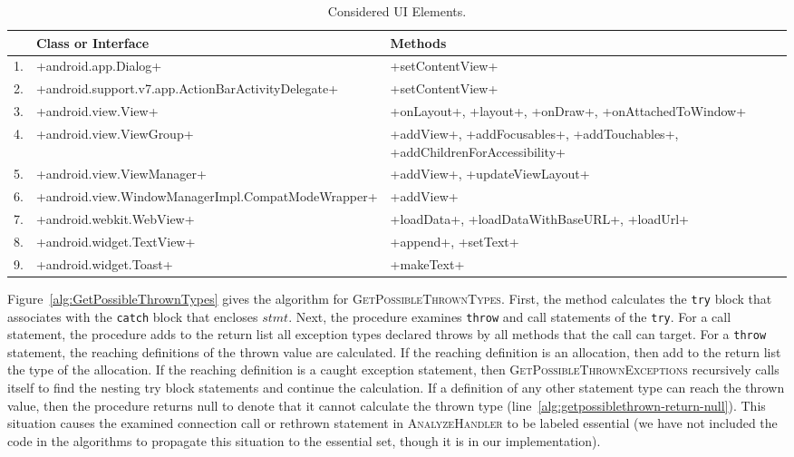 \begin{table}[t]
\small
\renewcommand*{\arraystretch}{1.3}
\caption{Considered UI Elements.}
\label{tbl:ui}
\centering
\tabcolsep=1.5pt
\begin{tabular}{|l|P{3.7cm}|P{4cm}|}
\hline
& \textbf{Class or Interface} & \textbf{Methods} \\
. & +android.app.Dialog+                                 & +setContentView+ \\
2. & +android.support.v7.app.ActionBarActivityDelegate+  & +setContentView+ \\
3. & +android.view.View+                                  & +onLayout+, +layout+, +onDraw+, +onAttachedToWindow+ \\
4. & +android.view.ViewGroup+                             & +addView+, +addFocusables+, +addTouchables+, +addChildrenForAccessibility+ \\
5. & +android.view.ViewManager+                           & +addView+, +updateViewLayout+ \\
6. & +android.view.WindowManagerImpl.CompatModeWrapper+  & +addView+ \\
7. & +android.webkit.WebView+                             & +loadData+, +loadDataWithBaseURL+, +loadUrl+ \\
8. & +android.widget.TextView+       & +append+, +setText+ \\
9. & +android.widget.Toast+        & +makeText+ \\
\hline
\end{tabular}
\end{table}

Figure~\ref{alg:GetPossibleThrownTypes} gives the algorithm for
\textsc{GetPossibleThrownTypes}.  First, the method calculates the
\lstinline!try! block that associates with the \lstinline!catch! block
that encloses $stmt$. Next, the procedure examines \lstinline!throw!
and call statements of the \lstinline!try!.  For a call statement, the
procedure adds to the return list all exception types declared throws
by all methods that the call can target.  For a \lstinline!throw!
statement, the reaching definitions of the thrown value are
calculated.  If the reaching definition is an allocation, then add to
the return list the type of the allocation.  If the reaching
definition is a caught exception statement, then
\textsc{GetPossibleThrownExceptions} recursively calls itself to find
the nesting try block statements and continue the calculation.  If a
definition of any other statement type can reach the thrown value,
then the procedure returns null to denote that it cannot calculate the
thrown type (line~\ref{alg:getpossiblethrown-return-null}).  This
situation causes the examined connection call or rethrown statement in
\textsc{AnalyzeHandler} to be labeled essential (we have not included
the code in the algorithms to propagate this situation to the
essential set, though it is in our implementation).



